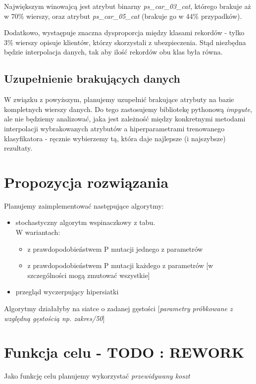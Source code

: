 \documentclass[11pt]{article}
\begin{document}
Największym winowajcą jest atrybut binarny \textsl{ps\_car\_03\_cat}, którego brakuje aż w 70\% wierszy, oraz atrybut \textsl{ps\_car\_05\_cat} (brakuje go w 44\% przypadków).

Dodatkowo, wystaępuje znaczna dysproporcja między klasami rekordów - tylko 3\% wierszy opisuje klientów, którzy skorzystali z ubezpieczenia. Stąd niezbędna będzie interpolacja danych, tak aby ilość rekordów obu klas była równa.

\subsection{Uzupełnienie brakujących danych}
W związku z powyższym, planujemy uzupełnić brakujące atrybuty na bazie kompletnych wierszy danych. Do tego zastosujemy bibliotekę pythonową \textsl{impyute}, ale nie będziemy analizować, jaka jest zależność między konkretnymi metodami interpolacji wybrakowanych atrybutów a hiperparametrami trenowanego klasyfikatora - ręcznie wybierzemy tą, która daje najlepsze (i najszybsze) rezultaty.

\section{Propozycja rozwiązania}
Planujemy zaimplementować następujące algorytmy:
\begin{itemize}
	\item stochastyczny algorytm wspinaczkowy z tabu. \\ W wariantach:
		\begin{itemize}
			\item z prawdopodobieństwem P mutacji jednego z parametrów
			\item z prawdopodobieństwem P mutacji każdego z parametrów [w szczególności mogą zmutować wszystkie]
		\end{itemize}
	\item przegląd wyczerpujący hipersiatki
\end{itemize}
Algorytmy działałyby na siatce o zadanej gęstości [\textsl{parametry próbkowane z względną gęstością np. zakres/50}]

\section{Funkcja celu - TODO : REWORK}
Jako funkcję celu planujemy wykorzystać \textsl{przewidywany koszt}
\end{document}

